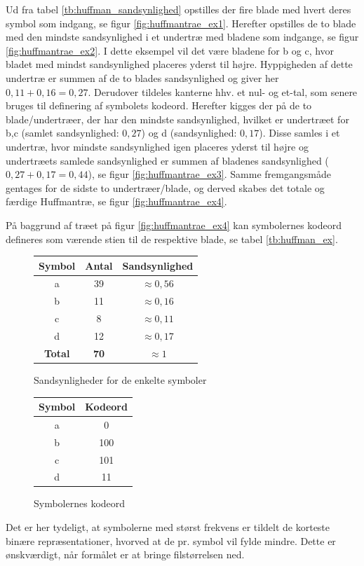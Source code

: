 Ud fra tabel \vref{tb:huffman_sandsynlighed} opstilles der fire blade med hvert deres symbol som indgang, se figur \vref{fig:huffmantrae_ex1}. Herefter opstilles de to blade med den mindste sandsynlighed i et undertræ med bladene som indgange, se figur \vref{fig:huffmantrae_ex2}. I dette eksempel vil det være bladene for b og c, hvor bladet med mindst sandsynlighed placeres yderst til højre. Hyppigheden af dette undertræ er summen af de to blades sandsynlighed og giver her $0,11+0,16=0,27$. Derudover tildeles kanterne hhv. et nul- og et-tal, som senere bruges til definering af symbolets kodeord. Herefter kigges der på de to blade/undertræer, der har den mindste sandsynlighed, hvilket er undertræet for b,c (samlet sandsynlighed: $0,27$) og d (sandsynlighed: $0,17$). Disse samles i et undertræ, hvor mindste sandsynlighed igen placeres yderst til højre og undertræets samlede sandsynlighed er summen af bladenes sandsynlighed ($0,27+0,17=0,44$), se figur \vref{fig:huffmantrae_ex3}. Samme fremgangsmåde gentages for de sidste to undertræer/blade, og derved skabes det totale og færdige Huffmantræ, se figur \vref{fig:huffmantrae_ex4}.

På baggrund af træet på figur \vref{fig:huffmantrae_ex4} kan symbolernes kodeord defineres som værende stien til de respektive blade, se tabel \vref{tb:huffman_ex}.
\begin{figure}
\centering
\begin{minipage}{0.45\textwidth}
\centering
\begin{tabular}{|c|c|c|} 
\hline
\textbf{Symbol}	&	\textbf{Antal}	&	\textbf{Sandsynlighed}			\\ \hline
a				&	39				&	$\approx  0,56$					\\ \hline
b				&	11				&	$\approx  0,16$					\\ \hline
c				&	8				&	$\approx  0,11$					\\ \hline
d				&	12				&	$\approx  0,17$					\\ \hline
\textbf{Total}	&	\textbf{70}		&	\textbf{$\approx 1$}			\\ \hline
\end{tabular}
\caption{Sandsynligheder for de enkelte symboler\label{tb:huffman_sandsynlighed}}
\end{minipage}
\hspace{0.5cm}
\begin{minipage}{0.45\textwidth}
\centering
\begin{tabular}{|c|c|} 
\hline
\textbf{Symbol}	&	\textbf{Kodeord}	\\ \hline
a		&	0	\\ \hline
b		&	100	\\ \hline
c		&	101	\\ \hline
d		&	11	\\ \hline
\end{tabular}
\caption{Symbolernes kodeord \label{tb:huffman_ex}}
\end{minipage}
\end{figure}
Det er her tydeligt, at symbolerne med størst frekvens er tildelt de korteste binære repræsentationer, hvorved at de pr. symbol vil fylde mindre. Dette er ønskværdigt, når formålet er at bringe filstørrelsen ned.

